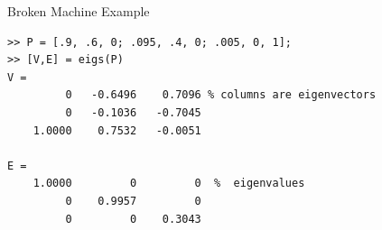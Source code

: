 \documentclass[10pt]{beamer}
\begin{document}

\begin{frame}[fragile]{Broken Machine Example}

\begin{lstlisting}[mathescape]
>> P = [.9, .6, 0; .095, .4, 0; .005, 0, 1];
>> [V,E] = eigs(P)  
V =    
         0   -0.6496    0.7096 % columns are eigenvectors 
         0   -0.1036   -0.7045
    1.0000    0.7532   -0.0051

E =
    1.0000         0         0  %  eigenvalues
         0    0.9957         0
         0         0    0.3043

\end{lstlisting}

\end{frame}

\end{document}
